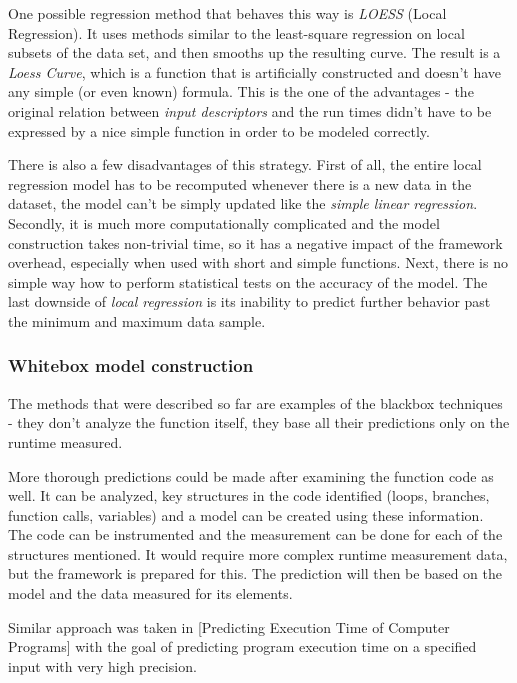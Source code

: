 One possible regression method that behaves this way is \textit{LOESS} (Local Regression). It uses methods similar to the least-square regression on local subsets of the data set, and then smooths up the resulting curve. The result is a \textit{Loess Curve}, which is a function that is artificially constructed and doesn't have any simple (or even known) formula. This is the one of the advantages - the original relation between \textit{input descriptors} and the run times didn't have to be expressed by a nice simple function in order to be modeled correctly.


There is also a few disadvantages of this strategy. First of all, the entire local regression model has to be recomputed whenever there is a new data in the dataset, the model can't be simply updated like the \textit{simple linear regression}. Secondly, it is much more computationally complicated and the model construction takes non-trivial time, so it has a negative impact of the framework overhead, especially when used with short and simple functions. Next, there is no simple way how to perform statistical tests on the accuracy of the model. The last downside of \textit{local regression} is its inability to predict further behavior past the minimum and maximum data sample.

\subsubsection{Whitebox model construction}

The methods that were described so far are examples of the blackbox techniques - they don't analyze the function itself, they base all their predictions only on the runtime measured.

More thorough predictions could be made after examining the function code as well. It can be analyzed, key structures in the code identified (loops, branches, function calls, variables) and a model can be created using these information. The code can be instrumented and the measurement can be done for each of the structures mentioned. It would require more complex runtime measurement data, but the framework is prepared for this. The prediction will then be based on the model and the data measured for its elements.

Similar approach was taken in [Predicting Execution Time of Computer Programs] with the goal of predicting program execution time on a specified input with very high precision.


